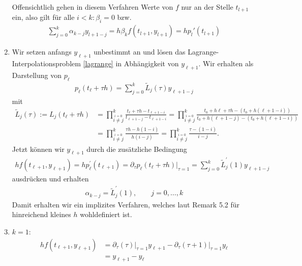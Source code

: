 \begin{solution}
\begin{enumerate}[label = \textbf{\alph*)}]
  Offensichtlich gehen in diesem Verfahren Werte von $f$ nur an der Stelle $t_{l+1}$ ein, also gilt für alle $i<k: \beta_i = 0$ bzw.
  \begin{align}\label{eqallg}
    \sum_{j=0}^k \alpha_{k-j} y_{l+1-j} = h \beta_k f(t_{l+1},y_{l+1}) = h p_l' (t_{l+1})
  \end{align}

  \item Wir setzen anfangs $y_{\ell + 1}$ unbestimmt an und lösen das Lagrange-Interpolationsproblem
  \eqref{lagrange} in Abhängigkeit von $y_{\ell + 1}$.
  Wir erhalten als Darstellung von $p_{\ell}$
  \begin{align*}
    p_{\ell}(t_{\ell} + \tau h) = \sum_{j=0}^k\tilde{L}_j(\tau)y_{\ell + 1 - j}
  \end{align*}
  mit
  \begin{align*}
    \tilde{L}_j(\tau) := L_j(t_{\ell} + \tau h) &= \prod_{\stackrel{i = 0}{i \neq j}}^{k}\frac{t_{\ell} + \tau h - t_{\ell + 1 - i}}{t_{\ell + 1 -j} - t_{\ell + 1 - i}}
    = \prod_{\stackrel{i = 0}{i \neq j}}^{k}\frac{t_0 + h{\ell} + \tau h - (t_0 + h(\ell + 1 - i))}{t_0 + h(\ell + 1 -j) - (t_0
    + h(\ell + 1 - i))} \\
    &=  \prod_{\stackrel{i = 0}{i \neq j}}^{k}\frac{\tau h - h(1 - i)}{h(i - j)}
    = \prod_{\stackrel{i = 0}{i \neq j}}^{k}\frac{\tau  - (1 - i)}{i - j}.
  \end{align*}
  Jetzt können wir $y_{\ell + 1}$ durch die zusätzliche Bedingung
  \begin{align*}
    hf(t_{\ell + 1},y_{\ell + 1}) = hp_{\ell}^{\prime}(t_{\ell + 1}) = \partial_{\tau}p_{\ell}(t_{\ell} + \tau h)|_{\tau = 1} =
    \sum_{j=0}^k\tilde{L}_j^{\prime}(1)y_{\ell + 1 - j}
  \end{align*}
  ausdrücken und erhalten
  \begin{align*}
    \alpha_{k - j} = \tilde{L}_j^{\prime}(1), \qquad j = 0,\dots,k
  \end{align*}
  Damit erhalten wir ein implizites Verfahren, welches laut Remark 5.2 für
  hinreichend kleines $h$ wohldefiniert ist.
  \item $k = 1$:
  \begin{align*}
    hf(t_{\ell + 1},y_{\ell + 1}) &= \partial_{\tau}(\tau)\Bigg|_{\tau = 1}y_{\ell + 1} -
    \partial_{\tau}(\tau + 1)\Bigg|_{\tau = 1}y_{\ell} \\
    &= y_{\ell + 1} - y_{\ell}

\end{align*}
\end{enumerate}
\end{solution}
